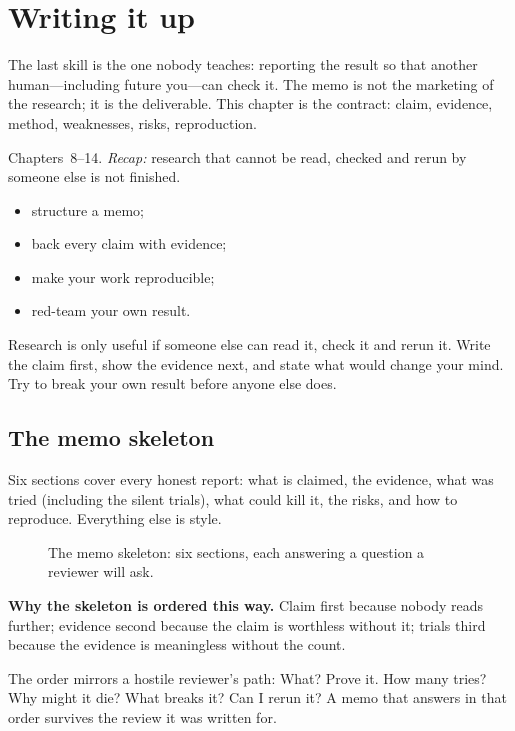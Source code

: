 \chapter{Writing it up}\label{ch:writeup}

\noindent The last skill is the one nobody teaches: reporting the result so that another
human---including future you---can check it. The memo is not the marketing of the
research; it is the deliverable. This chapter is the contract: claim, evidence, method,
weaknesses, risks, reproduction.

\begin{rulebox}
Chapters~8--14. \emph{Recap:} research that cannot be read, checked and rerun by someone else is not finished.
\end{rulebox}
\begin{wins}
\begin{itemize}
\item structure a memo;
\item back every claim with evidence;
\item make your work reproducible;
\item red-team your own result.
\end{itemize}
\end{wins}
\begin{principle}
Research is only useful if someone else can read it, check it and rerun it. Write the claim first, show the evidence next, and state what would change your mind. Try to break your own result before anyone else does.
\end{principle}

\section{The memo skeleton}\label{sec:memo}

Six sections cover every honest report: what is claimed, the evidence, what was tried
(including the silent trials), what could kill it, the risks, and how to reproduce.
Everything else is style.

\begin{figure}[htbp]\centering

\caption{The memo skeleton: six sections, each answering a question a reviewer will ask.}
\label{fig:memo}
\end{figure}

\begin{example}\label{ex:memo}
\textbf{Why the skeleton is ordered this way.} Claim first because nobody reads further;
evidence second because the claim is worthless without it; trials third because the
evidence is meaningless without the count.
\begin{solution}
The order mirrors a hostile reviewer's path: What? Prove it. How many tries? Why might
it die? What breaks it? Can I rerun it? A memo that answers in that order survives the
review it was written for.
\end{solution}
\end{example}

